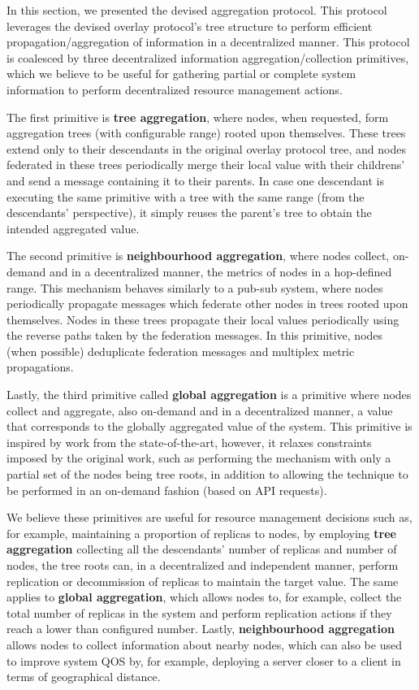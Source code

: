In this section, we presented the devised aggregation protocol. This protocol leverages the devised overlay protocol's tree structure to perform efficient propagation/aggregation of information in a decentralized manner. This protocol is coalesced by three decentralized information aggregation/collection primitives, which we believe to be useful for gathering partial or complete system information to perform decentralized resource management actions. 

The first primitive is \textbf{tree aggregation}, where nodes, when requested, form aggregation trees (with configurable range) rooted upon themselves. These trees extend only to their descendants in the original overlay protocol tree, and nodes federated in these trees periodically merge their local value with their childrens' and send a message containing it to their parents. In case one descendant is executing the same primitive with a tree with the same range (from the descendants' perspective), it simply reuses the parent's tree to obtain the intended aggregated value. 

The second primitive is \textbf{neighbourhood aggregation}, where nodes collect, on-demand and in a decentralized manner, the metrics of nodes in a hop-defined range. This mechanism behaves similarly to a pub-sub system, where nodes periodically propagate messages which federate other nodes in trees rooted upon themselves. Nodes in these trees propagate their local values periodically using the reverse paths taken by the federation messages. In this primitive, nodes (when possible) deduplicate federation messages and multiplex metric propagations.

Lastly, the third primitive called \textbf{global aggregation} is a primitive where nodes collect and aggregate, also on-demand and in a decentralized manner, a value that corresponds to the globally aggregated value of the system. This primitive is inspired by work from the state-of-the-art, however, it relaxes constraints imposed by the original work, such as performing the mechanism with only a partial set of the nodes being tree roots, in addition to allowing the technique to be performed in an on-demand fashion (based on API requests).

We believe these primitives are useful for resource management decisions such as, for example, maintaining a proportion of replicas to nodes, by employing \textbf{tree aggregation} collecting all the descendants' number of replicas and number of nodes, the tree roots can, in a decentralized and independent manner, perform replication or decommission of replicas to maintain the target value. The same applies to \textbf{global aggregation}, which allows nodes to, for example, collect the total number of replicas in the system and perform replication actions if they reach a lower than configured number. Lastly, \textbf{neighbourhood aggregation} allows nodes to collect information about nearby nodes, which can also be used to improve system QOS by, for example, deploying a server closer to a client in terms of geographical distance.

